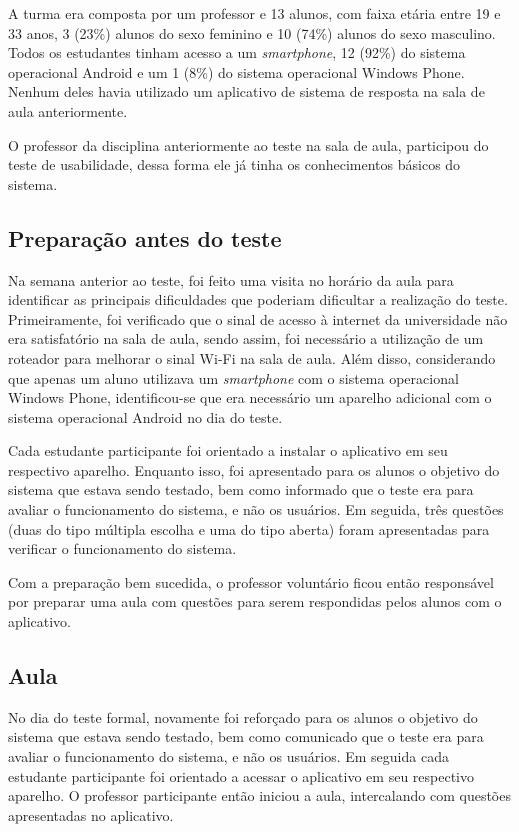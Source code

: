 A turma era composta por um professor e 13 alunos, com faixa etária entre 19 e 33 anos, 3 (23\%)
alunos do sexo feminino e 10 (74\%) alunos do sexo masculino. Todos os estudantes
tinham acesso a um \textit{smartphone}, 12 (92\%) do sistema operacional Android e um
1 (8\%) do sistema operacional Windows Phone.
Nenhum deles havia utilizado um aplicativo de sistema de resposta na sala de aula anteriormente.

O professor da disciplina anteriormente ao teste na sala de aula, participou do teste de usabilidade,
dessa forma ele já tinha os conhecimentos básicos do sistema.

\subsection{Preparação antes do teste}

Na semana anterior ao teste, foi feito uma visita no horário da aula para
identificar as principais dificuldades que poderiam dificultar a realização do teste.
Primeiramente, foi verificado que o sinal de acesso à internet da universidade não era
satisfatório na sala de aula, sendo assim, foi necessário a utilização de um roteador
para melhorar o sinal Wi-Fi na sala de aula.
Além disso, considerando que apenas um aluno utilizava um \textit{smartphone} com
o sistema operacional Windows Phone, identificou-se que era necessário um aparelho adicional com o
sistema operacional Android no dia do teste.

Cada estudante participante foi orientado a instalar o aplicativo em seu respectivo aparelho.
Enquanto isso, foi apresentado para os alunos o objetivo do sistema que estava sendo testado,
bem como informado que o teste era para avaliar o funcionamento do sistema, e não os usuários.
Em seguida, três questões (duas do tipo múltipla escolha e uma do tipo aberta)
foram apresentadas para verificar o funcionamento do sistema.

Com a preparação bem sucedida, o professor voluntário ficou então responsável por
preparar uma aula com questões para serem respondidas pelos alunos com o aplicativo.

\subsection{Aula}

No dia do teste formal, novamente foi reforçado para os alunos o objetivo do sistema que estava sendo testado,
bem como comunicado que o teste era para avaliar o funcionamento do sistema, e não os usuários.
Em seguida cada estudante participante foi orientado a acessar o aplicativo em seu respectivo aparelho.
O professor participante então iniciou a aula, intercalando com questões apresentadas no aplicativo.

